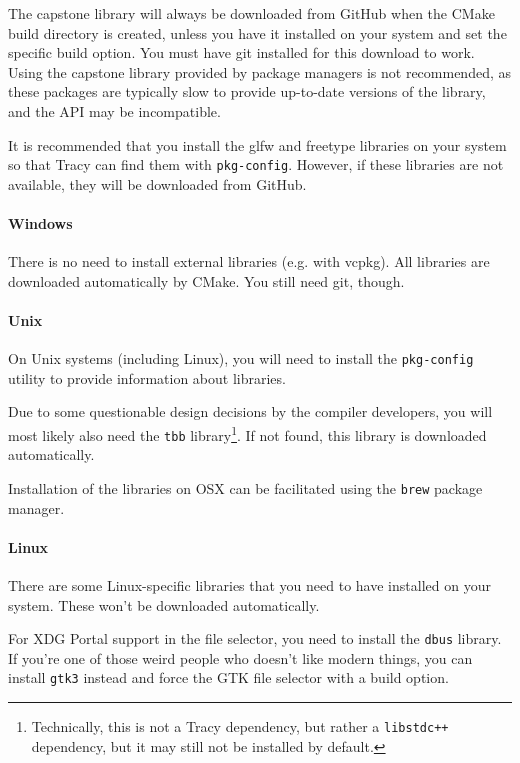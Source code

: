 \documentclass[hidelinks,titlepage,a4paper,twoside]{article}
\begin{document}
The capstone library will always be downloaded from GitHub when the CMake build directory is created, unless you have it installed on your system and set the specific build option. You must have git installed for this download to work. Using the capstone library provided by package managers is not recommended, as these packages are typically slow to provide up-to-date versions of the library, and the API may be incompatible.

It is recommended that you install the glfw and freetype libraries on your system so that Tracy can find them with \texttt{pkg-config}. However, if these libraries are not available, they will be downloaded from GitHub.

\paragraph{Windows}

There is no need to install external libraries (e.g. with vcpkg). All libraries are downloaded automatically by CMake. You still need git, though.

\paragraph{Unix}

On Unix systems (including Linux), you will need to install the \texttt{pkg-config} utility to provide information about libraries.

Due to some questionable design decisions by the compiler developers, you will most likely also need the \texttt{tbb} library\footnote{Technically, this is not a Tracy dependency, but rather a \texttt{libstdc++} dependency, but it may still not be installed by default.}. If not found, this library is downloaded automatically.

Installation of the libraries on OSX can be facilitated using the \texttt{brew} package manager.

\paragraph{Linux}

There are some Linux-specific libraries that you need to have installed on your system. These won't be downloaded automatically.

For XDG Portal support in the file selector, you need to install the \texttt{dbus} library. If you're one of those weird people who doesn't like modern things, you can install \texttt{gtk3} instead and force the GTK file selector with a build option.
\end{document}
